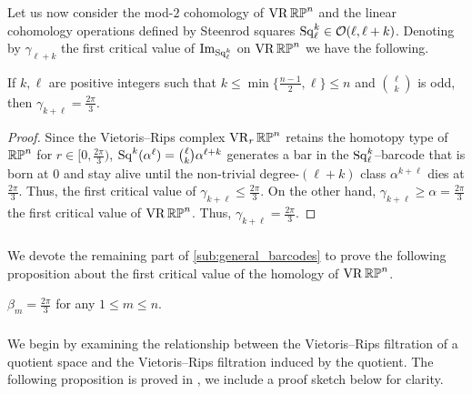 \subsubsection{}\label{subsub:gamma_rpn}

Let us now consider the mod-\(2\) cohomology of \(\operatorname{VR}\mathbb{RP}^n\) and the linear cohomology operations defined by Steenrod squares \(\operatorname{Sq}^k_\ell \in \mathcal{O}(\ell,\ell+k)\).
Denoting by \(\gamma_{\ell+k}\) the first critical value of \(\operatorname{Im}_{\operatorname{Sq}^k_\ell}\) on \(\operatorname{VR}\mathbb{RP}^n\) we have the following.

\medskip\proposition
If $k,\ell$ are positive integers such that $k \leq \min\{\frac{n-1}{2}, \ell\} \leq n$ and $\binom{\ell}{k}$ is odd, then $\gamma_{k+\ell} = \tfrac{2\pi}{3}$.

\begin{proof}
	Since the Vietoris--Rips complex $\operatorname{VR}_r\mathbb{RP}^n$ retains the homotopy type of $\mathbb{RP}^n$ for $r \in [0,\tfrac{2\pi}{3})$, $\operatorname{Sq}^k(\alpha^\ell) = \binom{\ell}{k}\alpha^{\ell+k}$ generates a bar in the $\operatorname{Sq}^k_\ell$--barcode that is born at $0$ and stay alive until the non-trivial degree-$(\ell+k)$ class $\alpha^{k+\ell}$ dies at $\tfrac{2\pi}{3}$.
	Thus, the first critical value of $\gamma_{k+\ell} \leq \tfrac{2\pi}{3}$.
	On the other hand, $\gamma_{k+\ell} \geq \alpha = \tfrac{2\pi}{3}$ the first critical value of $\operatorname{VR}\mathbb{RP}^n$.
	Thus, $\gamma_{k+\ell} = \tfrac{2\pi}{3}$.
\end{proof}

\subsubsection{}\label{subsub:beta_m_rpn}

We devote the remaining part of \cref{sub:general_barcodes} to prove the following proposition about the first critical value of the homology of $\operatorname{VR}\mathbb{RP}^n$.

\medskip\proposition
$\beta_m=\frac{2\pi}{3}$ for any $1\leq m\leq n$.

\subsubsection{}\label{subsub:h}

We begin by examining the relationship between the Vietoris--Rips filtration of a quotient space and the Vietoris--Rips filtration induced by the quotient.
The following proposition is proved in \cite[Proposition 3.5]{adams2022metric}, we include a proof sketch below for clarity.

